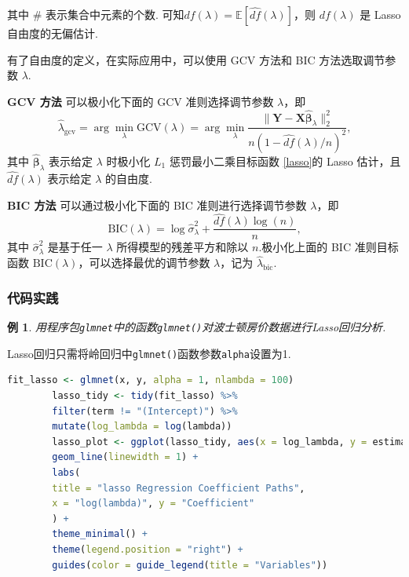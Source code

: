 \documentclass[12pt, a4paper, oneside]{ctexart}
\newtheorem{example}[theorem]{例}
\begin{document}
	其中 $\#$ 表示集合中元素的个数. 可知$df(\lambda) = \mathbb{E}[\widehat{df}(\lambda)]$，则 $df(\lambda)$ 是 Lasso 自由度的无偏估计.
	
	有了自由度的定义，在实际应用中，可以使用 GCV 方法和 BIC 方法选取调节参数 $\lambda$.
	
	\textbf{GCV 方法} \quad 可以极小化下面的 GCV 准则选择调节参数 $\lambda$，即
	\[
	\hat{\lambda}_{\text{gcv}} = \arg\min_{\lambda} \text{GCV}(\lambda) = \arg\min_{\lambda} \frac{\|\bm{Y} - \bm{X}\hat{\bm{\beta}}_{\lambda}\|_2^2}{n(1 - \hat{df}(\lambda)/n)^2},
	\]
	其中 $\hat{\bm{\beta}}_{\lambda}$ 表示给定 $\lambda$ 时极小化 $L_1$ 惩罚最小二乘目标函数 \eqref{lasso}的 Lasso 估计，且 $\hat{df}(\lambda)$ 表示给定 $\lambda$ 的自由度.
	
	\textbf{BIC 方法} \quad 可以通过极小化下面的 BIC 准则进行选择调节参数 $\lambda$，即
	\[
	\text{BIC}(\lambda) = \log \hat{\sigma}^2_{\lambda} + \frac{\hat{df}(\lambda) \log(n)}{n},
	\]
	其中 $\hat{\sigma}^2_{\lambda}$ 是基于任一 $\lambda$ 所得模型的残差平方和除以 $n$.极小化上面的 BIC 准则目标函数 $\text{BIC}(\lambda)$，可以选择最优的调节参数 $\lambda$，记为 $\hat{\lambda}_{\text{bic}}$.
	
	\subsubsection{代码实践}
	\begin{example}
		用程序包\texttt{glmnet}中的函数\texttt{glmnet()}对波士顿房价数据进行Lasso回归分析.
	\end{example}
	
	Lasso回归只需将岭回归中\texttt{glmnet()}函数参数\texttt{alpha}设置为1.
	
	\begin{lstlisting}[language=R]
		fit_lasso <- glmnet(x, y, alpha = 1, nlambda = 100)
		lasso_tidy <- tidy(fit_lasso) %>%
		filter(term != "(Intercept)") %>%
		mutate(log_lambda = log(lambda))
		lasso_plot <- ggplot(lasso_tidy, aes(x = log_lambda, y = estimate, color = term)) +
		geom_line(linewidth = 1) +
		labs(
		title = "lasso Regression Coefficient Paths",
		x = "log(lambda)", y = "Coefficient"
		) +
		theme_minimal() +
		theme(legend.position = "right") +
		guides(color = guide_legend(title = "Variables"))
	\end{lstlisting}
	
\end{document}
